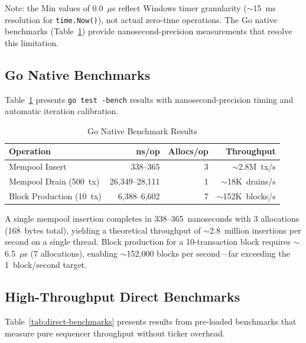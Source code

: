 Note: the Min values of 0.0~$\mu$s reflect Windows timer granularity
(${\sim}$15~ms resolution for \texttt{time.Now()}), not actual zero-time operations.
The Go native benchmarks (Table~\ref{tab:go-benchmarks}) provide nanosecond-precision
measurements that resolve this limitation.

\subsection{Go Native Benchmarks}

Table~\ref{tab:go-benchmarks} presents \texttt{go test -bench} results with
nanosecond-precision timing and automatic iteration calibration.

\begin{table}[htbp]
\caption{Go Native Benchmark Results}
\label{tab:go-benchmarks}
\centering
\begin{tabular}{lrrr}
\toprule
\textbf{Operation} & \textbf{ns/op} & \textbf{Allocs/op} & \textbf{Throughput} \\
\midrule
Mempool Insert & 338--365 & 3 & ${\sim}$2.8M~tx/s \\
Mempool Drain (500~tx) & 26{,}349--28{,}111 & 1 & ${\sim}$18K~drains/s \\
Block Production (10~tx) & 6{,}388--6{,}602 & 7 & ${\sim}$152K~blocks/s \\
\bottomrule
\end{tabular}
\end{table}

A single mempool insertion completes in 338--365~nanoseconds with 3 allocations
(168~bytes total), yielding a theoretical throughput of ${\sim}$2.8~million
insertions per second on a single thread. Block production for a 10-transaction
block requires ${\sim}$6.5~$\mu$s (7 allocations), enabling ${\sim}$152{,}000
blocks per second---far exceeding the 1~block/second target.

\subsection{High-Throughput Direct Benchmarks}

Table~\ref{tab:direct-benchmarks} presents results from pre-loaded benchmarks that
measure pure sequencer throughput without ticker overhead.

